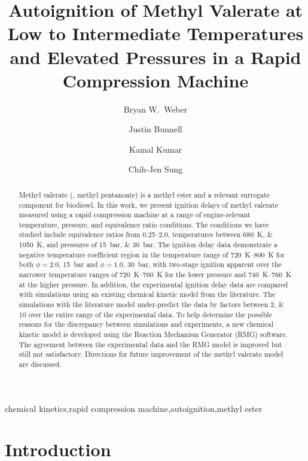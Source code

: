 \documentclass[12pt]{../ussci}
\title{ Autoignition of Methyl Valerate at Low to Intermediate Temperatures and Elevated Pressures in a Rapid Compression Machine }
\author[1*]{Bryan W.\ Weber}
\author[1]{Justin Bunnell}
\author[2]{Kamal Kumar}
\author[1]{Chih-Jen Sung}
\affil[1]{Department of Mechanical Engineering, University of Connecticut, Storrs, CT, USA}
\affil[2]{Department of Mechanical Engineering, University of Idaho, Moscow, ID, USA}
\affil[*]{Corresponding Author: \email{bryan.weber@uconn.edu}}
\begin{document}
\maketitle

\begin{abstract} %
    Methyl valerate (, methyl pentanoate) is a methyl ester and a
    relevant surrogate component for biodiesel. In this work, we present
    ignition delays of methyl valerate measured using a rapid compression
    machine at a range of engine-relevant temperature, pressure, and equivalence
    ratio conditions. The conditions we have studied include equivalence ratios
    from \numrange{0.25}{2.0}, temperatures between \SIlist{680;1050}{\K}, and
    pressures of \SIlist{15;30}{\bar}. The ignition delay data demonstrate a
    negative temperature coefficient region in the temperature range of
    \SIrange[range-phrase={--}]{720}{800}{\K} for both \(\phi=2.0\),
    \SI{15}{\bar} and \(\phi=1.0\), \SI{30}{\bar}, with two-stage ignition
    apparent over the narrower temperature ranges of
    \SIrange[range-phrase={--}]{720}{760}{\K} for the lower pressure and
    \SIrange[range-phrase={--}]{740}{760}{\K} at the higher pressure. In
    addition, the experimental ignition delay data are compared with simulations
    using an existing chemical kinetic model from the literature. The
    simulations with the literature model under-predict the data by factors
    between \numlist{2;10} over the entire range of the experimental data. To
    help determine the possible reasons for the discrepancy between simulations
    and experiments, a new chemical kinetic model is developed using the
    Reaction Mechanism Generator (RMG) software. The agreement between the
    experimental data and the RMG model is improved but still not satisfactory.
    Directions for future improvement of the methyl valerate model are
    discussed.
\end{abstract}

\begin{keyword}
    chemical kinetics\sep rapid compression machine\sep autoignition\sep methyl ester
\end{keyword}

\section{Introduction}\label{sec:introduction}
\end{document}
